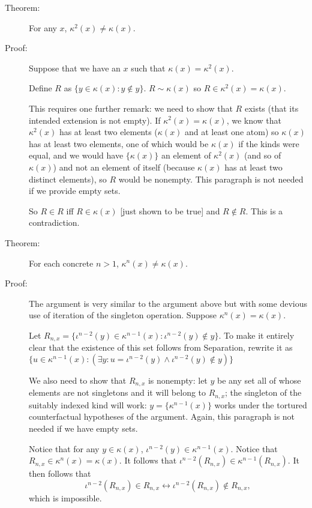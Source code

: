 \documentclass[12pt]{article}
\begin{document}
\begin{description}

\item[Theorem:]  For any $x$, $\kappa^2(x) \neq \kappa(x)$.

\item[Proof:]  Suppose that we have an $x$ such that $\kappa(x) = \kappa^2(x)$.

Define $R$ as $\{y \in \kappa(x):y \not\in y\}$.  $R \sim \kappa(x)$ so $R \in \kappa^2(x) = \kappa(x)$.

This requires one further remark:  we need to show that $R$ exists (that its intended extension is not empty).  If $\kappa^2(x)=\kappa(x)$,
we know that $\kappa^2(x)$ has at least two elements ($\kappa(x)$ and at least one atom) so
$\kappa(x)$ has at least two elements, one of which would be $\kappa(x)$ if the kinds were equal,
and we would have $\{\kappa(x)\}$ an element of $\kappa^2(x)$ (and so of $\kappa(x)$) and not an element of itself (because $\kappa(x)$ has at least two distinct elements), so $R$ would be nonempty.  This paragraph is not needed if we provide empty sets.

So $R \in R$ iff $R \in \kappa(x)$ [just shown to be true] and $R \not\in R$.  This is a contradiction.



\item[Theorem:]  For each concrete $n>1$, $\kappa^n(x) \neq \kappa(x)$.

\item[Proof:]  The argument is very similar to the argument above but with some devious use of iteration of the singleton operation.  Suppose $\kappa^n(x)=\kappa(x)$.

Let $R_{n,x} = \{\iota^{n-2}(y)\in \kappa^{n-1}(x):\iota^{n-2}(y) \not\in y\}$.  To make it entirely clear that the existence of this set follows from Separation, rewrite it as $\{u\in \kappa^{n-1}(x):(\exists y:u = \iota^{n-2}(y) \wedge \iota^{n-2}(y) \not\in y)\}$ 

We also need to show that $R_{n,x}$ is nonempty:  let $y$ be any set all of whose elements are not singletons
and it will belong to $R_{n,x}$;  the singleton of the suitably indexed kind will work:  $y = \{\kappa^{n-1}(x)\}$ works under the tortured counterfactual hypotheses of the argument.  Again, this paragraph is not needed if we have empty sets.

Notice that
for any $y \in \kappa(x)$, $\iota^{n-2}(y)\in \kappa^{n-1}(x)$.  Notice that $R_{n,x} \in \kappa^n(x) = \kappa(x)$.  It follows that $\iota^{n-2}(R_{n,x})\in \kappa^{n-1}(R_{n,x})$.  It then follows that
$$\iota^{n-2}(R_{n,x})\in R_{n,x} \leftrightarrow \iota^{n-2}(R_{n,x}) \not\in R_{n,x},$$ which is impossible.




\end{description}
\end{document}
